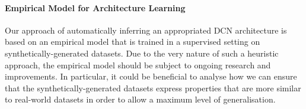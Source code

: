 \paragraph{Empirical Model for Architecture Learning} Our approach of automatically inferring an appropriated DCN architecture is based on an empirical model that is trained in a supervised setting on synthetically-generated datasets. Due to the very nature of such a heuristic approach, the empirical model should be subject to ongoing research and improvements. In particular, it could be beneficial to analyse how we can ensure that the synthetically-generated datasets express properties that are more similar to real-world datasets in order to allow a maximum level of generalisation.  


%



